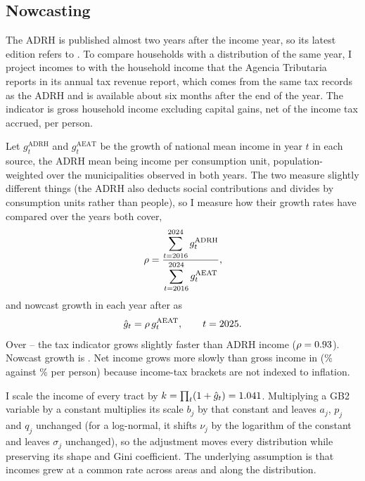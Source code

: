 \subsection{Nowcasting}\label{sec:nowcast}

The ADRH is published almost two years after the income year, so its latest edition refers to \BaseYear{}. To compare households with a distribution of the same year, I project incomes to \TargetYear{} with the household income that the Agencia Tributaria reports in its annual tax revenue report, which comes from the same tax records as the ADRH and is available about six months after the end of the year. The indicator is gross household income excluding capital gains, net of the income tax accrued, per person.

Let $g^{\text{ADRH}}_t$ and $g^{\text{AEAT}}_t$ be the growth of national mean income in year $t$ in each source, the ADRH mean being income per consumption unit, population-weighted over the municipalities observed in both years. The two measure slightly different things (the ADRH also deducts social contributions and divides by consumption units rather than people), so I measure how their growth rates have compared over the years both cover,
\begin{equation}
\rho = \frac{\displaystyle\sum_{t=2016}^{2024} g^{\text{ADRH}}_t}{\displaystyle\sum_{t=2016}^{2024} g^{\text{AEAT}}_t},
\end{equation}
and nowcast growth in each year after \BaseYear{} as
\begin{equation}
\hat{g}_t = \rho \, g^{\text{AEAT}}_t, \qquad t = 2025.
\end{equation}
Over \NowcastFirstYear--\NowcastLastYear{} the tax indicator grows slightly faster than ADRH income ($\rho = 0.93{}$). Nowcast growth is \NowcastGrowthByYear{}. Net income grows more slowly than gross income in \TargetYear{} (\AeatNetTarget{}\% against \AeatGrossTarget{}\% per person) because income-tax brackets are not indexed to inflation.

I scale the income of every tract by $k = \prod_t (1+\hat{g}_t) = 1.041{}$. Multiplying a GB2 variable by a constant multiplies its scale $b_j$ by that constant and leaves $a_j$, $p_j$ and $q_j$ unchanged (for a log-normal, it shifts $\nu_j$ by the logarithm of the constant and leaves $\sigma_j$ unchanged), so the adjustment moves every distribution while preserving its shape and Gini coefficient. The underlying assumption is that incomes grew at a common rate across areas and along the distribution.

